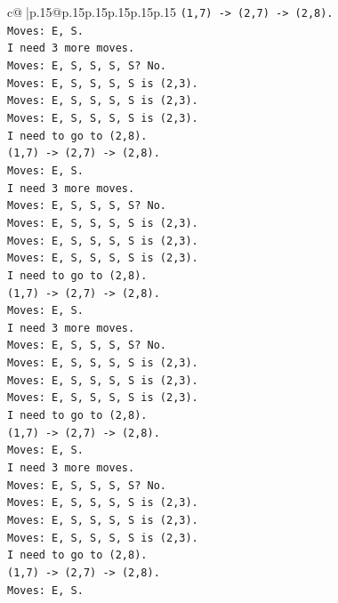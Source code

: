 \documentclass{article}
\begin{document}
{\begin{supertabular}{c@{$\;$}|p{.15\linewidth}@{}p{.15\linewidth}p{.15\linewidth}p{.15\linewidth}p{.15\linewidth}p{.15\linewidth}}
{{{\texttt{(1,7) {-}> (2,7) {-}> (2,8).} \\
\texttt{Moves: E, S.} \\
\texttt{I need 3 more moves.} \\
\texttt{Moves: E, S, S, S, S? No.} \\
\texttt{Moves: E, S, S, S, S is (2,3).} \\
\texttt{Moves: E, S, S, S, S is (2,3).} \\
\texttt{Moves: E, S, S, S, S is (2,3).} \\
\texttt{I need to go to (2,8).} \\
\texttt{(1,7) {-}> (2,7) {-}> (2,8).} \\
\texttt{Moves: E, S.} \\
\texttt{I need 3 more moves.} \\
\texttt{Moves: E, S, S, S, S? No.} \\
\texttt{Moves: E, S, S, S, S is (2,3).} \\
\texttt{Moves: E, S, S, S, S is (2,3).} \\
\texttt{Moves: E, S, S, S, S is (2,3).} \\
\texttt{I need to go to (2,8).} \\
\texttt{(1,7) {-}> (2,7) {-}> (2,8).} \\
\texttt{Moves: E, S.} \\
\texttt{I need 3 more moves.} \\
\texttt{Moves: E, S, S, S, S? No.} \\
\texttt{Moves: E, S, S, S, S is (2,3).} \\
\texttt{Moves: E, S, S, S, S is (2,3).} \\
\texttt{Moves: E, S, S, S, S is (2,3).} \\
\texttt{I need to go to (2,8).} \\
\texttt{(1,7) {-}> (2,7) {-}> (2,8).} \\
\texttt{Moves: E, S.} \\
\texttt{I need 3 more moves.} \\
\texttt{Moves: E, S, S, S, S? No.} \\
\texttt{Moves: E, S, S, S, S is (2,3).} \\
\texttt{Moves: E, S, S, S, S is (2,3).} \\
\texttt{Moves: E, S, S, S, S is (2,3).} \\
\texttt{I need to go to (2,8).} \\
\texttt{(1,7) {-}> (2,7) {-}> (2,8).} \\
\texttt{Moves: E, S.} \\
}}}
\end{supertabular}}
\end{document}
